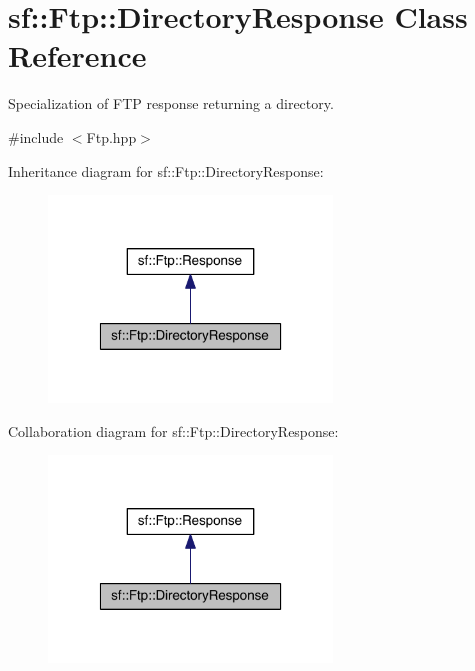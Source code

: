 \hypertarget{classsf_1_1_ftp_1_1_directory_response}{\section{sf\-:\-:Ftp\-:\-:Directory\-Response Class Reference}
\label{classsf_1_1_ftp_1_1_directory_response}
}


Specialization of F\-T\-P response returning a directory.  




{\ttfamily \#include $<$Ftp.\-hpp$>$}



Inheritance diagram for sf\-:\-:Ftp\-:\-:Directory\-Response\-:
\nopagebreak
\begin{figure}[H]
\begin{center}
\leavevmode
\includegraphics[width=214pt]{classsf_1_1_ftp_1_1_directory_response__inherit__graph}
\end{center}
\end{figure}


Collaboration diagram for sf\-:\-:Ftp\-:\-:Directory\-Response\-:
\nopagebreak
\begin{figure}[H]
\begin{center}
\leavevmode
\includegraphics[width=214pt]{classsf_1_1_ftp_1_1_directory_response__coll__graph}
\end{center}
\end{figure}
